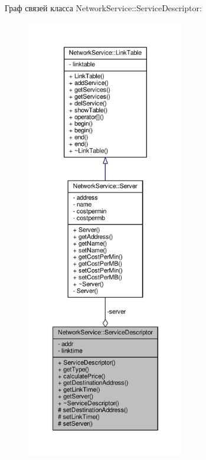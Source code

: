 Граф связей класса Network\+Service\+:\+:Service\+Descriptor\+:
\nopagebreak
\begin{figure}[H]
\begin{center}
\leavevmode
\includegraphics[height=550pt]{class_network_service_1_1_service_descriptor__coll__graph}
\end{center}
\end{figure}
